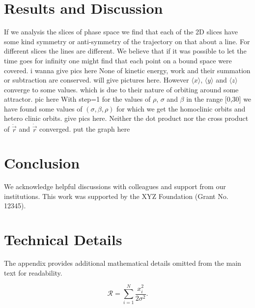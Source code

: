 \documentclass[%
 reprint,
 amsmath,amssymb,
 aps,
 floatfix,
]{revtex4-2}
\begin{document}
\section{Results and Discussion}
If we analysis the slices of phase space we find that each of the 2D slices have some kind symmetry or anti-symmetry of the trajectory on that about a line. For different slices the lines are different. We believe that if it was possible to let the time goes for infinity one might find that each point on a bound space were covered. 
i wanna give pics here
None of kinetic energy, work and their summation or subtraction are conserved.
will give pictures here.
However $\langle x\rangle$, $\langle y\rangle$ and  $\langle z\rangle$ converge to some values. which is due to their nature of orbiting around some attractor. 
pic here
With step=1 for the values of $\rho$, $\sigma$ and $\beta$ in the range [0,30] we have found some values of $(\sigma, \beta, \rho )$ for which we get the homoclinic orbits and hetero clinic orbits.
give pics here.
Neither the dot product nor the cross product of $\ddot{\vec{r}}$ and $\dot{\vec{r}}$ converged.
put  the graph here
\section{Conclusion}

\begin{acknowledgments}
We acknowledge helpful discussions with colleagues and support from our institutions. This work was supported by the XYZ Foundation (Grant No. 12345).
\end{acknowledgments}

\appendix
\section{Technical Details}

The appendix provides additional mathematical details omitted from the main text for readability.

\begin{equation}
\mathcal{R} = \sum_{i=1}^N \frac{x_i^2}{2\sigma^2}.
\label{eq:appendix_eq}
\end{equation}


\end{document}
